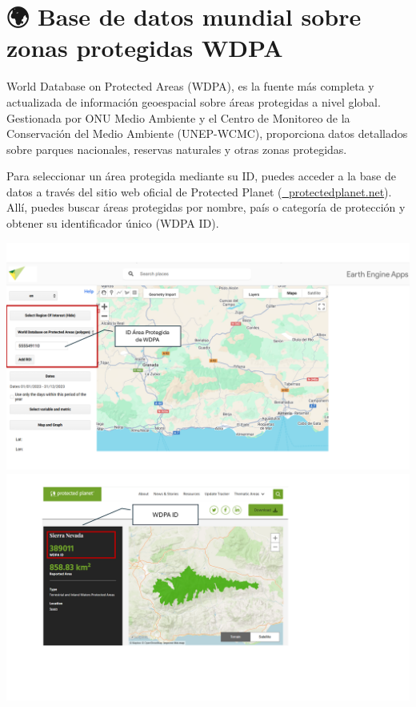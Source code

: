 \documentclass[
]{book}
\begin{document}
\section{\texorpdfstring{\textbf{🌍 Base de datos mundial sobre zonas protegidas WDPA}}{🌍 Base de datos mundial sobre zonas protegidas WDPA}}\label{base-de-datos-mundial-sobre-zonas-protegidas-wdpa}

World Database on Protected Areas (WDPA), es la fuente más completa y actualizada de información geoespacial sobre áreas protegidas a nivel global. Gestionada por ONU Medio Ambiente y el Centro de Monitoreo de la Conservación del Medio Ambiente (UNEP-WCMC), proporciona datos detallados sobre parques nacionales, reservas naturales y otras zonas protegidas.

Para seleccionar un área protegida mediante su ID, puedes acceder a la base de datos a través del sitio web oficial de Protected Planet (\href{https://www.protectedplanet.net/}{🔗 protectedplanet.net}). Allí, puedes buscar áreas protegidas por nombre, país o categoría de protección y obtener su identificador único (WDPA ID).

\includegraphics{assets/WDPA_es.png}
\includegraphics{assets/WDPA2.png}
\end{document}
